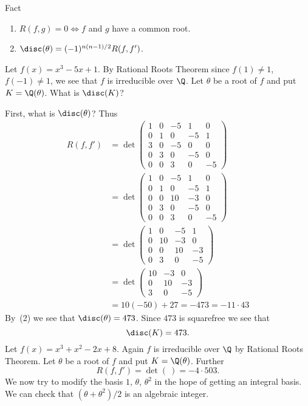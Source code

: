Fact
\begin{enumerate}
\item $R(f,g)=0\iff f$ and $g$ have a common root.
\item $\disc(\theta)=(-1)^{n(n-1)/2}R(f,f')$.
\end{enumerate}
\eg Let $f(x)=x^3-5x+1$.  By Rational Roots Theorem since $f(1)\neq1$, $f(-1)\neq1$, we see that $f$ is irreducible over $\Q$.  Let $\theta$ be a root of $f$ and put $K=\Q(\theta)$.  What is $\disc(K)$?

First, what is $\disc(\theta)$?  Thus
\begin{align*}
R(f,f') &= \det\begin{pmatrix}
1 & 0 & -5 & 1 & 0 \\
0 & 1 & 0 & -5 & 1 \\
3 & 0 & -5 & 0 & 0 \\
0 & 3 & 0 & -5 & 0 \\
0 & 0 & 3 & 0 & -5
\end{pmatrix} \\ 
&= \det\begin{pmatrix}
1 & 0 & -5 & 1 & 0 \\
0 & 1 & 0 & -5 & 1 \\
0 & 0 & 10 & -3 & 0 \\
0 & 3 & 0 & -5 & 0 \\
0 & 0 & 3 & 0 & -5
\end{pmatrix} \\
&= \det\begin{pmatrix}
1 & 0 & -5 & 1 \\
0 & 10 & -3 & 0 \\
0 & 0 & 10 & -3 \\
0 & 3 & 0 & -5
\end{pmatrix} \\
&= \det\begin{pmatrix}
10 & -3 & 0 \\
0 & 10 & -3 \\
3 & 0 & -5
\end{pmatrix} \\
&= 10(-50) + 27 = -473 = -11\cdot43
\end{align*}
By~(2) we see that $\disc(\theta)=473$.  Since $473$ is squarefree we see that
\[ \disc(K) = 473 . \]
 Let $f(x)=x^3+x^2-2x+8$.  Again $f$ is irreducible over $\Q$ by Rational Roots Theorem.  Let $\theta$ be a root of $f$ and put $K=\Q(\theta)$.  Further
\[ R(f,f') = \det(~) = -4 \cdot 503 . \]
We now try to modify the basis $1$, $\theta$, $\theta^2$ in the hope of getting an integral basis.  We can check that $(\theta+\theta^2)/2$ is an algebraic integer.